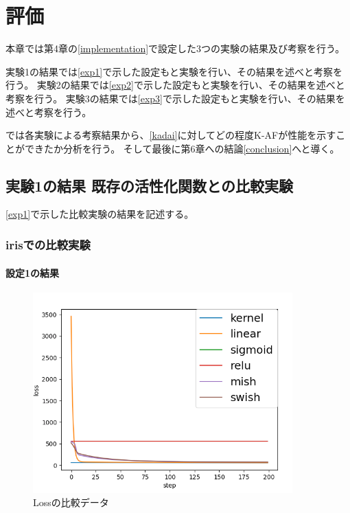 \chapter{評価}
\label{evaluation}

本章では第4章の\ref{implementation}で設定した3つの実験の結果及び考察を行う。

実験1の結果\label{evo1}では\ref{exp1}で示した設定もと実験を行い、その結果を述べと考察を行う。
実験2の結果\label{evo2}では\ref{exp2}で示した設定もと実験を行い、その結果を述べと考察を行う。
実験3の結果\label{evo3}では\ref{exp3}で示した設定もと実験を行い、その結果を述べと考察を行う。

\label{result}では各実験による考察結果から、\ref{kadai}に対してどの程度K-AFが性能を示すことができたか分析を行う。
そして最後に第6章への結論\ref{conclusion}へと導く。


\section{実験1の結果 既存の活性化関数との比較実験}
\label{evo1}
\ref{exp1}で示した比較実験の結果を記述する。

\subsection{irisでの比較実験}
\label{ev:iris}

\subsubsection{設定1の結果}


\begin{figure}[hbtp]
    \begin{center}
        \includegraphics[width=10cm]{asset/boston_0000001_SGDkaiming_normal__non_200.png}
            \caption{Lossの比較データ}
            \label{boston}
    \end{center}
\end{figure}


